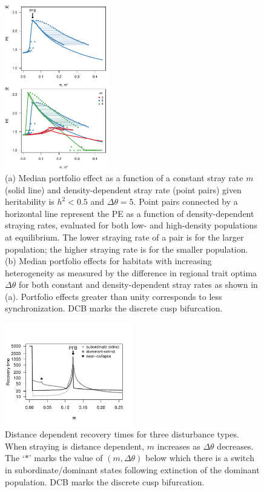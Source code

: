 \documentclass{revtex4}
\begin{document}
\begin{figure}
  \captionsetup{justification=raggedright,
singlelinecheck=false
}
\centering
\includegraphics[width=0.4\textwidth]{fig_thetaPEmvm.pdf}
\caption{
(a) Median portfolio effect as a function of a constant stray rate $m$ (solid line) and density-dependent stray rate (point pairs) given heritability is $h^2 < 0.5$ and $\Delta\theta=5$.
Point pairs connected by a horizontal line represent the PE as a function of density-dependent straying rates, evaluated for both low- and high-density populations at equilibrium. The lower straying rate of a pair is for the larger population; the higher straying rate is for the smaller population.
(b) Median portfolio effects for habitats with increasing heterogeneity as measured by the difference in regional trait optima $\Delta \theta$ for both constant and density-dependent stray rates as shown in (a).
Portfolio effects greater than unity corresponds to less synchronization.
DCB marks the discrete cusp bifurcation.
} \label{fig:thetaPE}
\end{figure}


\begin{figure}
  \captionsetup{justification=raggedright,
singlelinecheck=false
}
  \centering
  \includegraphics[width=0.5\textwidth]{fig_mtheta_rt.pdf}
  \caption{
  Distance dependent recovery times for three disturbance types. When straying is distance dependent, $m$ increases as $\Delta\theta$ decreases.
  The `$*$' marks the value of $(m,\Delta\theta)$ below which there is a switch in subordinate/dominant states following extinction of the dominant population.
  DCB marks the discrete cusp bifurcation.
  } \label{fig:mtheta}
\end{figure}
\end{document}

